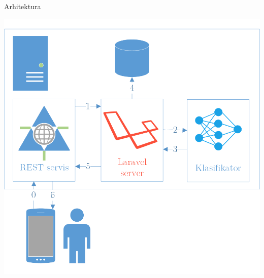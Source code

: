 \documentclass{beamer}
\begin{document}
\begin{frame}{Arhitektura}
    \begin{center}
        \includegraphics[scale=0.3]{./slike/arch.png}
    \end{center}
\end{frame}
\end{document}
